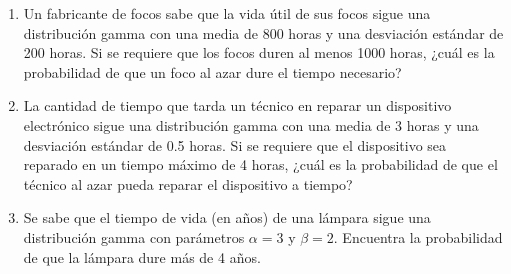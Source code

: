 \begin{Ejer}
\begin{enumerate}
    \item Un fabricante de focos sabe que la vida útil de sus focos sigue una distribución gamma con una media de 800 horas y una desviación estándar de 200 horas. Si se requiere que los focos duren al menos 1000 horas, ¿cuál es la probabilidad de que un foco al azar dure el tiempo necesario?

    \item La cantidad de tiempo que tarda un técnico en reparar un dispositivo electrónico sigue una distribución gamma con una media de 3 horas y una desviación estándar de 0.5 horas. Si se requiere que el dispositivo sea reparado en un tiempo máximo de 4 horas, ¿cuál es la probabilidad de que el técnico al azar pueda reparar el dispositivo a tiempo?

    \item Se sabe que el tiempo de vida (en años) de una lámpara sigue una distribución gamma con parámetros $\alpha=3$ y $\beta=2$. Encuentra la probabilidad de que la lámpara dure más de 4 años.
\end{enumerate}
\end{Ejer}


